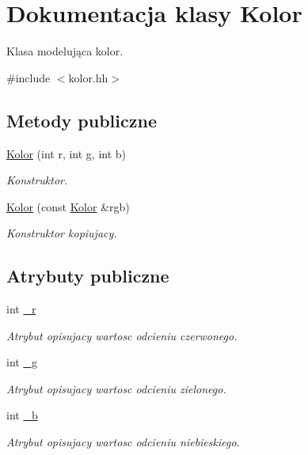 \hypertarget{class_kolor}{\section{Dokumentacja klasy Kolor}
\label{class_kolor}
}


Klasa modelująca kolor.  




{\ttfamily \#include $<$kolor.\-hh$>$}

\subsection*{Metody publiczne}
\begin{DoxyCompactItemize}
\item 
\hyperlink{class_kolor_adde4f304856649a8a148288c271d4775}{Kolor} (int r, int g, int b)
\begin{DoxyCompactList}\small\item\em Konstruktor. \end{DoxyCompactList}\item 
\hyperlink{class_kolor_a79baff3add17cc61abb8bc71f0a426e6}{Kolor} (const \hyperlink{class_kolor}{Kolor} \&rgb)
\begin{DoxyCompactList}\small\item\em Konstruktor kopiujacy. \end{DoxyCompactList}\end{DoxyCompactItemize}
\subsection*{Atrybuty publiczne}
\begin{DoxyCompactItemize}
\item 
int \hyperlink{class_kolor_ad887fb53be523b39fbead6a24671751e}{\-\_\-r}
\begin{DoxyCompactList}\small\item\em Atrybut opisujacy wartosc odcieniu czerwonego. \end{DoxyCompactList}\item 
int \hyperlink{class_kolor_a568f73268d43f0e76c8ae75f0ef20229}{\-\_\-g}
\begin{DoxyCompactList}\small\item\em Atrybut opisujacy wartosc odcieniu zielonego. \end{DoxyCompactList}\item 
int \hyperlink{class_kolor_a543b5984743ac9d471409c697382038b}{\-\_\-b}
\begin{DoxyCompactList}\small\item\em Atrybut opisujacy wartosc odcieniu niebieskiego. \end{DoxyCompactList}\end{DoxyCompactItemize}


